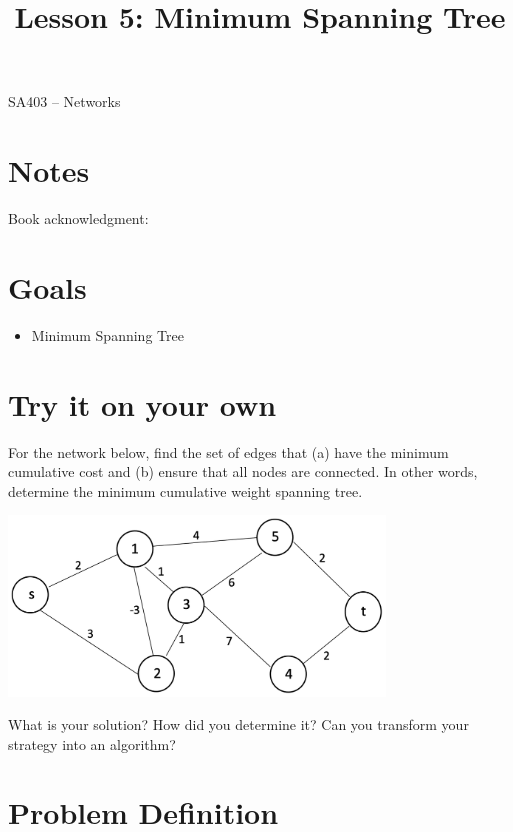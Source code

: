 \documentclass[12pt]{article}
\makeatletter
\theoremstyle{definition}
\newcommand{\graphbox}[5]%
{
\begin{tikzpicture}
     [>=latex,scale=#5]
     
     \draw [->,very thick] (#1, 0) -- (#2, 0) node[right] {$x$};
     \draw [->,very thick] (0, #3) -- (0, #4) node[above] {$y$};
     
     \draw[step=1cm,thick,dotted] (#1,#3) grid (#2,#4);
   \end{tikzpicture}
   }
\renewcommand{\maketitle}{
  \noindent SA403 -- Networks \\

  \begin{center}\Large{\textbf{\@title}}\end{center}
}
\makeatother
\begin{document}

\title{Lesson 5: Minimum Spanning Tree}


\maketitle


\section*{Notes}

Book acknowledgment:
\section*{Goals}
\begin{itemize}
\item Minimum Spanning Tree
\end{itemize}


\section{Try it on your own}

For the network below, find the set of edges that (a) have the minimum cumulative cost and (b) ensure that all nodes are connected. In other words, determine the minimum cumulative weight spanning tree.

\begin{center}
\includegraphics[width=10cm]{minspanningtree}
\end{center}

\vfill

What is your solution? How did you determine it? Can you transform your strategy into an algorithm?

\vfill


\newpage
\section{Problem Definition}
\end{document}
